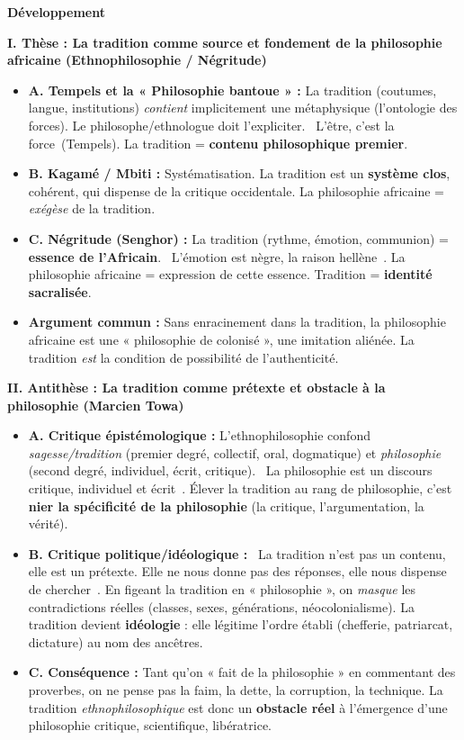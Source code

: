 \documentclass[11pt]{article}
\begin{document}
\begin{corrige}
\textbf{Développement}

\textbf{I. Thèse : La tradition comme source et fondement de la philosophie africaine (Ethnophilosophie / Négritude)}
\begin{itemize}
\item \textbf{A. Tempels et la « Philosophie bantoue » :} La tradition (coutumes, langue, institutions) \emph{contient} implicitement une métaphysique (l'ontologie des forces). Le philosophe/ethnologue doit l'expliciter. \guillemotleft~L'être, c'est la force~\guillemotright (Tempels). La tradition = \textbf{contenu philosophique premier}.
\item \textbf{B. Kagamé / Mbiti :} Systématisation. La tradition est un \textbf{système clos}, cohérent, qui dispense de la critique occidentale. La philosophie africaine = \emph{exégèse} de la tradition.
\item \textbf{C. Négritude (Senghor) :} La tradition (rythme, émotion, communion) = \textbf{essence de l'Africain}. \guillemotleft~L'émotion est nègre, la raison hellène~\guillemotright. La philosophie africaine = expression de cette essence. Tradition = \textbf{identité sacralisée}.
\item \textbf{Argument commun :} Sans enracinement dans la tradition, la philosophie africaine est une « philosophie de colonisé », une imitation aliénée. La tradition \emph{est} la condition de possibilité de l'authenticité.
\end{itemize}

\textbf{II. Antithèse : La tradition comme prétexte et obstacle à la philosophie (Marcien Towa)}
\begin{itemize}
\item \textbf{A. Critique épistémologique :} L'ethnophilosophie confond \emph{sagesse/tradition} (premier degré, collectif, oral, dogmatique) et \emph{philosophie} (second degré, individuel, écrit, critique). \guillemotleft~La philosophie est un discours critique, individuel et écrit~\guillemotright. Élever la tradition au rang de philosophie, c'est \textbf{nier la spécificité de la philosophie} (la critique, l'argumentation, la vérité).
\item \textbf{B. Critique politique/idéologique :} \guillemotleft~La tradition n'est pas un contenu, elle est un prétexte. Elle ne nous donne pas des réponses, elle nous dispense de chercher~\guillemotright. En figeant la tradition en « philosophie », on \emph{masque} les contradictions réelles (classes, sexes, générations, néocolonialisme). La tradition devient \textbf{idéologie} : elle légitime l'ordre établi (chefferie, patriarcat, dictature) au nom des ancêtres.
\item \textbf{C. Conséquence :} Tant qu'on « fait de la philosophie » en commentant des proverbes, on ne pense pas la faim, la dette, la corruption, la technique. La tradition \emph{ethnophilosophique} est donc un \textbf{obstacle réel} à l'émergence d'une philosophie critique, scientifique, libératrice.
\end{itemize}


\end{corrige}
\end{document}
